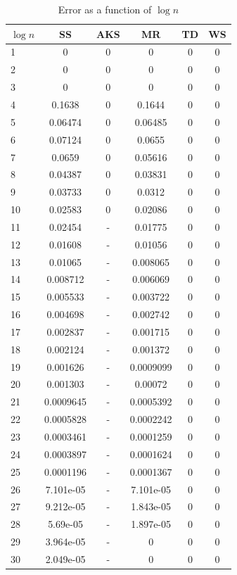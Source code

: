 \begin{table}
    \centering
    \caption{Error as a function of $\log n$}
    \begin{tabular}{|l|c|c|c|c|c|} \hline
        $\log n$ & SS & AKS & MR & TD & WS \\
        \hline
1 & 0 & 0 & 0 & 0 & 0 \\
2 & 0 & 0 & 0 & 0 & 0 \\
3 & 0 & 0 & 0 & 0 & 0 \\
4 & 0.1638 & 0 & 0.1644 & 0 & 0 \\
5 & 0.06474 & 0 & 0.06485 & 0 & 0 \\
6 & 0.07124 & 0 & 0.0655 & 0 & 0 \\
7 & 0.0659 & 0 & 0.05616 & 0 & 0 \\
8 & 0.04387 & 0 & 0.03831 & 0 & 0 \\
9 & 0.03733 & 0 & 0.0312 & 0 & 0 \\
10 & 0.02583 & 0 & 0.02086 & 0 & 0 \\
11 & 0.02454 & - & 0.01775 & 0 & 0 \\
12 & 0.01608 & - & 0.01056 & 0 & 0 \\
13 & 0.01065 & - & 0.008065 & 0 & 0 \\
14 & 0.008712 & - & 0.006069 & 0 & 0 \\
15 & 0.005533 & - & 0.003722 & 0 & 0 \\
16 & 0.004698 & - & 0.002742 & 0 & 0 \\
17 & 0.002837 & - & 0.001715 & 0 & 0 \\
18 & 0.002124 & - & 0.001372 & 0 & 0 \\
19 & 0.001626 & - & 0.0009099 & 0 & 0 \\
20 & 0.001303 & - & 0.00072 & 0 & 0 \\
21 & 0.0009645 & - & 0.0005392 & 0 & 0 \\
22 & 0.0005828 & - & 0.0002242 & 0 & 0 \\
23 & 0.0003461 & - & 0.0001259 & 0 & 0 \\
24 & 0.0003897 & - & 0.0001624 & 0 & 0 \\
25 & 0.0001196 & - & 0.0001367 & 0 & 0 \\
26 & 7.101e-05 & - & 7.101e-05 & 0 & 0 \\
27 & 9.212e-05 & - & 1.843e-05 & 0 & 0 \\
28 & 5.69e-05 & - & 1.897e-05 & 0 & 0 \\
29 & 3.964e-05 & - & 0 & 0 & 0 \\
30 & 2.049e-05 & - & 0 & 0 & 0 \\

\end{tabular}
\end{table}
